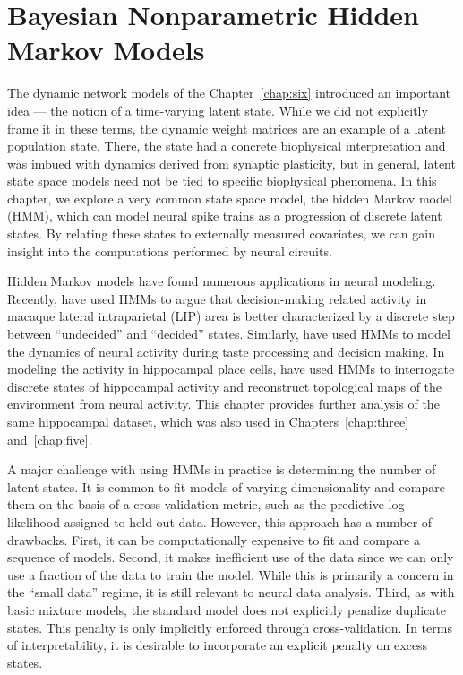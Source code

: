  
\chapter{Bayesian Nonparametric Hidden Markov Models}
\label{chap:seven}

The dynamic network models of the Chapter~\ref{chap:six} introduced 
an important idea --- the notion of a time-varying latent state. While 
we did not explicitly frame it in these terms, the dynamic weight 
matrices are an example of a latent population state. There, the state had 
a concrete biophysical interpretation and was imbued with dynamics derived from synaptic plasticity, 
but in general, latent state space models need not be tied 
to specific biophysical phenomena. In this chapter, we explore a very common 
state space model, the hidden Markov model (HMM), which can   
model neural spike trains as a progression of discrete latent states.
By relating these states to externally measured covariates,
we can gain insight into the computations performed by neural circuits.

Hidden Markov models have found numerous applications in neural
modeling.  Recently, \citet{latimer2015single} have used HMMs to
argue that decision-making related activity in macaque lateral
intraparietal (LIP) area is better characterized by a discrete step
between ``undecided'' and ``decided'' states. Similarly, \citet{miller2010stochastic}
have used HMMs to model the dynamics of neural activity during taste 
processing and decision making. In modeling the activity in hippocampal
place cells, \citet{Chen12a, Chen14} have used HMMs to interrogate
discrete states of hippocampal activity and reconstruct topological 
maps of the environment from neural activity. This chapter provides
further analysis of the same hippocampal dataset, which was also used
in Chapters~\ref{chap:three} and~\ref{chap:five}.

A major challenge with using HMMs in practice is determining the
number of latent states. It is common to fit models of varying
dimensionality and compare them on the basis of a cross-validation
metric, such as the predictive log-likelihood assigned to held-out
data. However, this approach has a number of drawbacks. First, it can
be computationally expensive to fit and compare a sequence of
models. Second, it makes inefficient use of the data since we can only
use a fraction of the data to train the model. While this is primarily
a concern in the ``small data'' regime, it is still relevant to neural
data analysis. Third, as with basic mixture models, the standard model
does not explicitly penalize duplicate states. This penalty is only
implicitly enforced through cross-validation. In terms of
interpretability, it is desirable to incorporate an explicit penalty
on excess states.


